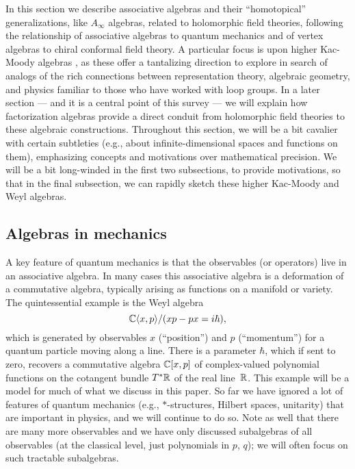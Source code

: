 \documentclass[11pt]{amsart}
\begin{document}
In this section we describe  associative algebras and their ``homotopical'' generalizations, like $A_\infty$ algebras, related to holomorphic field theories,
following the relationship of associative algebras to quantum mechanics and of vertex algebras to chiral conformal field theory.
A particular focus is upon higher Kac-Moody algebras \cite{FHK},
as these offer a tantalizing direction to explore in search of analogs of the rich connections between representation theory, algebraic geometry, and physics familiar to those who have worked with loop groups.
In a later section --- and it is a central point of this survey --- we will explain how factorization algebras provide a direct conduit from holomorphic field theories to these algebraic constructions.
Throughout this section, we will be a bit cavalier with certain subtleties (e.g., about infinite-dimensional spaces and functions on them), 
emphasizing concepts and motivations over mathematical precision.
We will be a bit long-winded in the first two subsections, to provide motivations,
so that in the final subsection, we can rapidly sketch these higher Kac-Moody and Weyl algebras.

\subsection{Algebras in mechanics}

A key feature of quantum mechanics is that the observables (or operators) live in an associative algebra.
In many cases this associative algebra is a deformation of a commutative algebra, typically arising as functions on a manifold or variety.
The quintessential example is the Weyl algebra
\[
\mathbb C \langle x, p \rangle /(xp - px = i \hbar),
\] 
which is generated by observables $x$ (``position'') and $p$ (``momentum'') for a quantum particle moving along a line.
There is a parameter $\hbar$, which if sent to zero, recovers a commutative algebra $\mathbb C [ x, p ]$ of complex-valued polynomial functions on the cotangent bundle $T^* \mathbb R$ of the real line~$\mathbb R$.
This example will be a model for much of what we discuss in this paper.
So far we have ignored a lot of features of quantum mechanics (e.g., $\ast$-structures, Hilbert spaces, unitarity) that are important in physics,
and we will continue to do so.
Note as well that there are many more observables and we have only discussed subalgebras of all observables (at the classical level, just polynomials in $p$, $q$);
we will often focus on such tractable subalgebras. 
\end{document}
